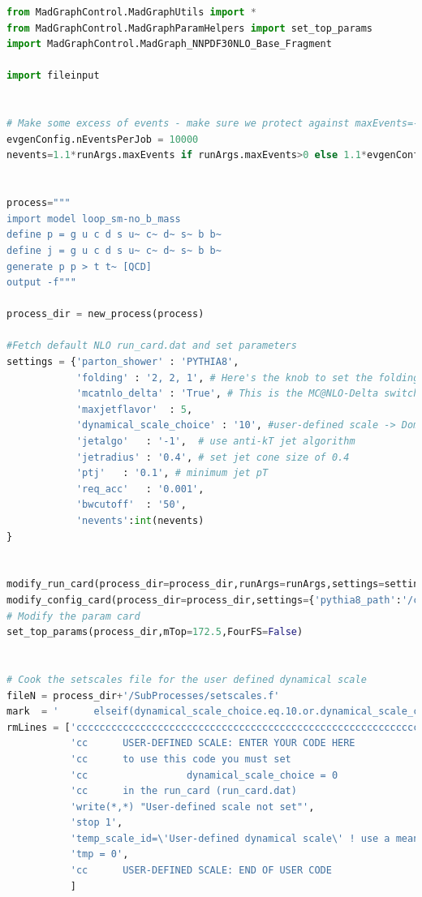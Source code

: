 \documentclass[NOTE, REPORT=true, atlasdraft=true, USenglish]{atlasdoc}
\begin{document}
\begin{lstlisting}[language=python, caption=$t\bar{t}$ job option python script]
from MadGraphControl.MadGraphUtils import *
from MadGraphControl.MadGraphParamHelpers import set_top_params
import MadGraphControl.MadGraph_NNPDF30NLO_Base_Fragment

import fileinput


# Make some excess of events - make sure we protect against maxEvents=-1
evgenConfig.nEventsPerJob = 10000
nevents=1.1*runArgs.maxEvents if runArgs.maxEvents>0 else 1.1*evgenConfig.nEventsPerJob


process="""
import model loop_sm-no_b_mass
define p = g u c d s u~ c~ d~ s~ b b~
define j = g u c d s u~ c~ d~ s~ b b~
generate p p > t t~ [QCD]
output -f"""

process_dir = new_process(process)

#Fetch default NLO run_card.dat and set parameters
settings = {'parton_shower' : 'PYTHIA8',
            'folding' : '2, 2, 1', # Here's the knob to set the folding parameters
            'mcatnlo_delta' : 'True', # This is the MC@NLO-Delta switch to turn it on
            'maxjetflavor'  : 5,
            'dynamical_scale_choice' : '10', #user-defined scale -> Dominic's definition of mt+1/2*(pt^2+ptx^2)
            'jetalgo'   : '-1',  # use anti-kT jet algorithm
            'jetradius' : '0.4', # set jet cone size of 0.4
            'ptj'	: '0.1', # minimum jet pT
            'req_acc'   : '0.001',
            'bwcutoff'  : '50',
            'nevents':int(nevents)            
}


modify_run_card(process_dir=process_dir,runArgs=runArgs,settings=settings)
modify_config_card(process_dir=process_dir,settings={'pythia8_path':'/cvmfs/atlas.cern.ch/repo/sw/software/23.6/sw/lcg/releases/MCGenerators/pythia8/309-bb414/x86_64-centos7-gcc11-opt/'})
# Modify the param card
set_top_params(process_dir,mTop=172.5,FourFS=False)


# Cook the setscales file for the user defined dynamical scale
fileN = process_dir+'/SubProcesses/setscales.f'
mark  = '      elseif(dynamical_scale_choice.eq.10.or.dynamical_scale_choice.eq.0) then'
rmLines = ['ccccccccccccccccccccccccccccccccccccccccccccccccccccccccccccccccccccccccccccccccccc',
           'cc      USER-DEFINED SCALE: ENTER YOUR CODE HERE                                 cc',
           'cc      to use this code you must set                                            cc',
           'cc                 dynamical_scale_choice = 0                                    cc',
           'cc      in the run_card (run_card.dat)                                           cc',
           'write(*,*) "User-defined scale not set"',
           'stop 1',
           'temp_scale_id=\'User-defined dynamical scale\' ! use a meaningful string',
           'tmp = 0',
           'cc      USER-DEFINED SCALE: END OF USER CODE                                     cc'
           ]


\end{lstlisting}
\end{document}
